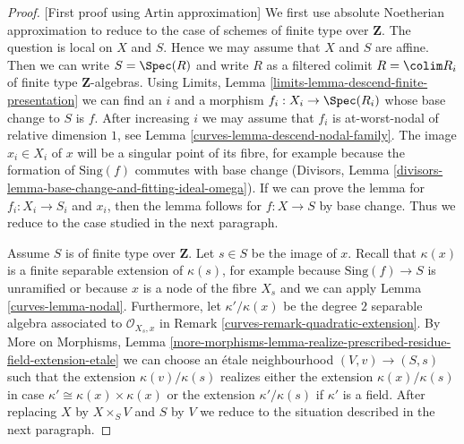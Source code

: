 \begin{proof}
[First proof using Artin approximation]
We first use absolute Noetherian approximation to reduce to the
case of schemes of finite type over $\mathbf{Z}$.
The question is local on $X$ and $S$. Hence we may assume that
$X$ and $S$ are affine. Then we can write $S = \Spec(R)$
and write $R$ as a filtered colimit $R = \colim R_i$
of finite type $\mathbf{Z}$-algebras.
Using Limits, Lemma \ref{limits-lemma-descend-finite-presentation}
we can find an $i$ and a morphism $f_i : X_i \to \Spec(R_i)$ whose base
change to $S$ is $f$. After increasing $i$ we may assume that $f_i$
is at-worst-nodal of relative dimension $1$, see
Lemma \ref{curves-lemma-descend-nodal-family}.
The image $x_i \in X_i$ of $x$ will be a singular
point of its fibre, for example because the formation of
$\text{Sing}(f)$ commutes with base change (Divisors, Lemma
\ref{divisors-lemma-base-change-and-fitting-ideal-omega}).
If we can prove the lemma for $f_i : X_i \to S_i$ and
$x_i$, then the lemma follows for $f : X \to S$ by base
change. Thus we reduce to the case studied in the next
paragraph.

\medskip\noindent
Assume $S$ is of finite type over $\mathbf{Z}$. Let $s \in S$ be the
image of $x$. Recall that $\kappa(x)$ is a finite separable extension
of $\kappa(s)$, for example because $\text{Sing}(f) \to S$
is unramified or because $x$ is a node of the fibre $X_s$
and we can apply Lemma \ref{curves-lemma-nodal}.
Furthermore, let $\kappa'/\kappa(x)$ be the
degree $2$ separable algebra associated to $\mathcal{O}_{X_s, x}$ in
Remark \ref{curves-remark-quadratic-extension}.
By More on Morphisms, Lemma
\ref{more-morphisms-lemma-realize-prescribed-residue-field-extension-etale}
we can choose an \'etale neighbourhood $(V, v) \to (S, s)$
such that the extension $\kappa(v)/\kappa(s)$ realizes either
the extension $\kappa(x)/\kappa(s)$ in case
$\kappa' \cong \kappa(x) \times \kappa(x)$ or
the extension $\kappa'/\kappa(s)$ if $\kappa'$ is a field.
After replacing $X$ by $X \times_S V$ and $S$ by $V$
we reduce to the situation described in the next paragraph.


\end{proof}
